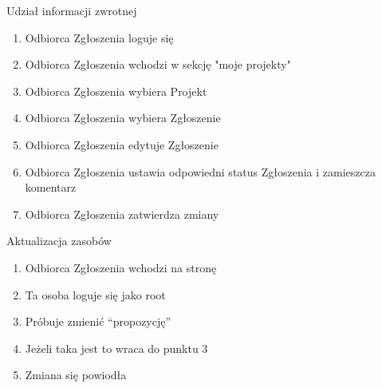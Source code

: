 \begin{usecase}{Udział informacji zwrotnej}
	\begin{enumerate}
    \item Odbiorca Zgłoszenia  loguje się
    \item Odbiorca Zgłoszenia wchodzi w sekcję "moje projekty"
    \item Odbiorca Zgłoszenia wybiera Projekt
    \item Odbiorca Zgłoszenia wybiera Zgłoszenie
    \item Odbiorca Zgłoszenia edytuje Zgłoszenie
    \item Odbiorca Zgłoszenia ustawia odpowiedni status Zgłoszenia i zamieszcza komentarz
    \item Odbiorca Zgłoszenia zatwierdza zmiany
	\end{enumerate}
\end{usecase}

\begin{usecase}{Aktualizacja zasobów}
	\begin{enumerate}
    \item Odbiorca Zgłoszenia wchodzi na stronę
    \item Ta osoba loguje się jako root
    \item Próbuje zmienić “propozycję”
    \item Jeżeli taka jest to wraca do punktu 3
    \item Zmiana się powiodła
	\end{enumerate}
\end{usecase}

